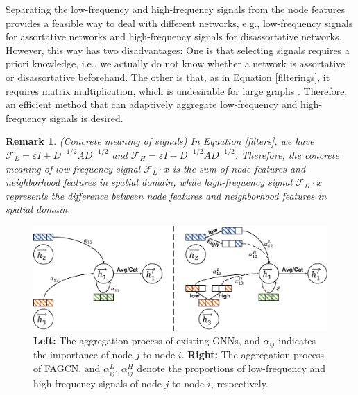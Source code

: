 \documentclass[letterpaper]{article} %
\newtheorem{remark}{Remark}
\begin{document}
Separating the low-frequency and high-frequency signals from the node features provides a feasible way to deal with different networks, e.g., low-frequency signals for assortative networks and high-frequency signals for disassortative networks.
However, this way has two disadvantages: One is that selecting signals requires a priori knowledge, i.e., we actually do not know whether a network is assortative or disassortative beforehand. The other is that, as in Equation \ref{filterings}, it requires matrix multiplication, which is undesirable for large graphs \cite{GraphSAGE}.
Therefore, an efficient method that can adaptively aggregate low-frequency and high-frequency signals is desired.


\begin{remark}
\label{rema}
	(Concrete meaning of signals)
	In Equation \ref{filters}, we have $\mathcal{F}_{L} = \varepsilon I + D^{-1/2}AD^{-1/2}$ and $\mathcal{F}_{H} = \varepsilon I - D^{-1/2}AD^{-1/2}$. 
	Therefore, the concrete meaning of low-frequency signal $\mathcal{F}_{L} \cdot x$ is the sum of node features and neighborhood features in spatial domain, while high-frequency signal $\mathcal{F}_{H} \cdot x$ represents the difference between node features and neighborhood features in spatial domain.
\end{remark}

\begin{figure}
\centering
\includegraphics[width=\linewidth]{image/model}
\caption{\textbf{Left:} The aggregation process of existing GNNs, and $\alpha_{ij}$ indicates the importance of node $j$ to node $i$. \textbf{Right:} The aggregation process of FAGCN, and $\alpha_{ij}^{L}$, $\alpha_{ij}^{H}$ denote the proportions of low-frequency and high-frequency signals of node $j$ to node $i$, respectively.}
\label{model}
\end{figure}
\end{document}
